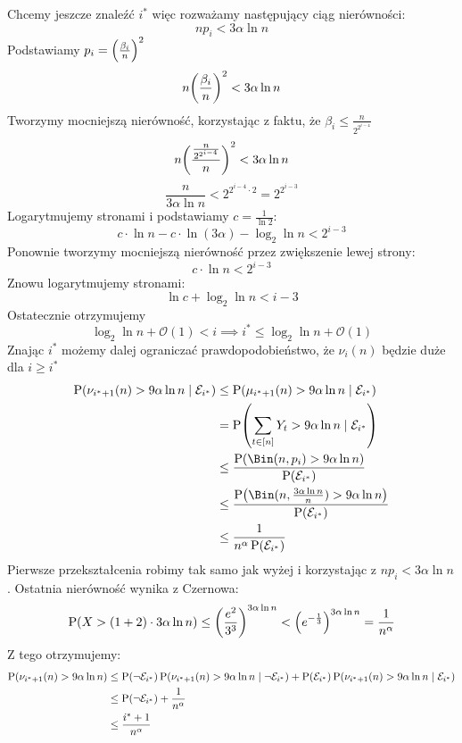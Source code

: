 Chcemy jeszcze znaleźć \( i^* \) więc rozważamy następujący ciąg nierówności:
\[
	np_i < 3\alpha\ln n
\]
Podstawiamy \( p_i = \left(\frac{\beta_i}{n}\right)^2 \)
\[
	n\pars{\frac{\beta_i}{n}}^2 < 3\alpha\ln n
\]
Tworzymy mocniejszą nierówność, korzystając z faktu, że \( \beta_i \leq \frac{n}{2^{2^{i-4}}} \)
\[
	n\pars{\frac{\frac{n}{2^{2^{i-4}}}}{n}}^2 < 3\alpha\ln n
\]
\[
	\frac{n}{3\alpha\ln n} < 2^{2^{i-4} \cdot 2} = 2^{2^{i-3}}
\]
Logarytmujemy stronami i podstawiamy \( c = \frac{1}{\ln2} \):
\[
	c \cdot \ln n - c \cdot \ln(3\alpha) - \log_2 \ln n < 2^{i-3}
\]
Ponownie tworzymy mocniejszą nierówność przez zwiększenie lewej strony:
\[
	c \cdot \ln n < 2^{i-3}
\]
Znowu logarytmujemy stronami:
\[
	\ln c + \log_2 \ln n < i-3
\]
Ostatecznie otrzymujemy
\[
	\log_2 \ln n + \mathcal{O}(1) < i \implies i^* \leq \log_2 \ln n + \mathcal{O}(1)
\]
Znając \( i^* \) możemy dalej ograniczać prawdopodobieństwo, że \( \nu_i(n) \) będzie duże dla \( i \geq i^* \)
\begin{align*}
	\prob\pars{\nu_{i^*+1}(n) > 9\alpha\ln n \mid \mathcal{E}_{i^*}} & \leq \prob\pars{\mu_{i^*+1}(n) > 9\alpha\ln n \mid \mathcal{E}_{i^*}}                                 \\
	                                                                 & = \prob\pars{\sum_{t \in [n]} Y_t > 9\alpha\ln n \mid \mathcal{E}_{i^*}}                              \\
	                                                                 & \leq \frac{\prob\pars{\Bin(n, p_i) > 9\alpha\ln n}}{\prob\pars{\mathcal{E}_{i^*}}}                    \\
	                                                                 & \leq \frac{\prob\pars{\Bin(n, \frac{3\alpha\ln n}{n}) > 9\alpha\ln n}}{\prob\pars{\mathcal{E}_{i^*}}} \\
	                                                                 & \leq \frac{1}{n^{\alpha}\prob\pars{\mathcal{E}_{i^*}}}
\end{align*}
Pierwsze przekształcenia robimy tak samo jak wyżej i korzystając z \( np_i < 3\alpha\ln n \). Ostatnia nierówność wynika z Czernowa:
\[
	\prob\pars{X > (1 + 2) \cdot 3\alpha\ln n} \leq \pars{\frac{e^2}{3^3}}^{3\alpha\ln n} < \pars{e^{-\frac{1}{3}}}^{3\alpha\ln n} = \frac{1}{n^{\alpha}}
\]
Z tego otrzymujemy:
\begin{align*}
	\prob\pars{\nu_{i^*+1}(n) > 9\alpha\ln n} & \leq \prob\pars{\neg\mathcal{E}_{i^*}} \prob\pars{\nu_{i^*+1}(n) > 9\alpha\ln n \mid \neg\mathcal{E}_{i^*}} + \prob\pars{\mathcal{E}_{i^*}} \prob\pars{\nu_{i^*+1}(n) > 9\alpha\ln n \mid \mathcal{E}_{i^*}} \\
	                                          & \leq \prob\pars{\neg\mathcal{E}_{i^*}} + \frac{1}{n^{\alpha}}                                                                                                                                                \\
	                                          & \leq \frac{i^* + 1}{n^{\alpha}}
\end{align*}
